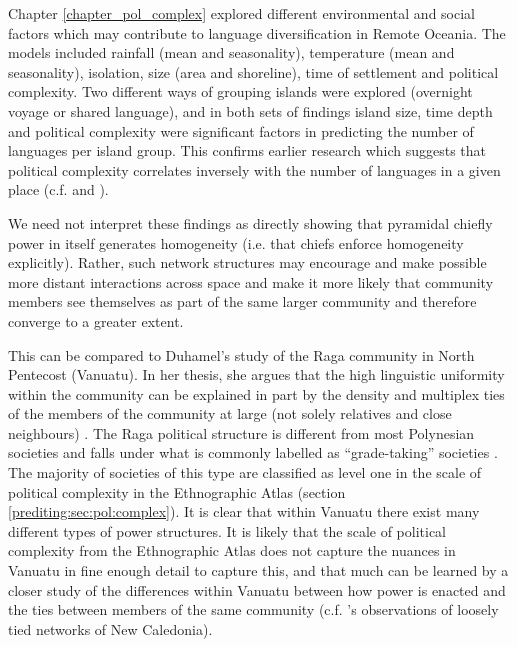 \documentclass[draft,10pt]{article} %
\begin{document}
Chapter \ref{chapter_pol_complex} explored different environmental and social factors which may contribute to language diversification in Remote Oceania. The models included rainfall (mean and seasonality), temperature (mean and seasonality), isolation, size (area and shoreline), time of settlement and political complexity. Two different ways of grouping islands were explored (overnight voyage or shared language), and in both sets of findings island size, time depth and political complexity were significant factors in predicting the number of languages per island group. This confirms earlier research which suggests that political complexity correlates inversely with the number of languages in a given place (c.f. \cite{pawley2007} and \cite{curriemace2009}). 

We need not interpret these findings as directly showing that pyramidal chiefly power in itself generates homogeneity (i.e. that chiefs enforce homogeneity explicitly). Rather, such network structures may encourage and make possible more distant interactions across space and make it more likely that community members see themselves as part of the same larger community and therefore converge to a greater extent. 

This can be compared to Duhamel's study of the Raga community in North Pentecost (Vanuatu). In her thesis, she argues that the high linguistic uniformity within the community can be explained in part by the density and multiplex ties of the members of the community at large (not solely relatives and close neighbours) \citep{duhamel2020raga}. The Raga political structure is different from most Polynesian societies and falls under what is commonly labelled as ``grade-taking'' societies \citep{bonnemaison1996graded}. The majority of societies of this type are classified as level one in the scale of political complexity in the Ethnographic Atlas (section \ref{prediting:sec:pol:complex}). It is clear that within Vanuatu there exist many different types of power structures. It is likely that the scale of political complexity from the Ethnographic Atlas does not capture the nuances in Vanuatu in fine enough detail to capture this, and that much can be learned by a closer study of the differences within Vanuatu between how power is enacted and the ties between members of the same community (c.f. \cite{grace_1992_aberrant}'s observations of loosely tied networks of New Caledonia).



\end{document}
